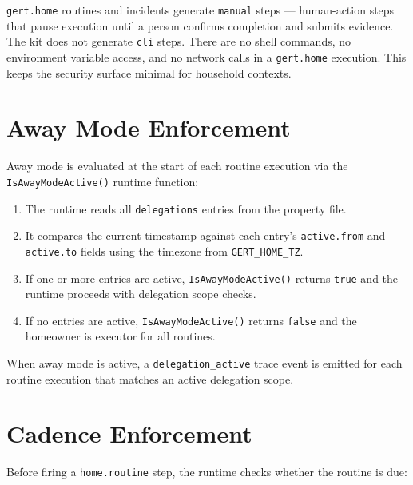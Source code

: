 \texttt{gert.home} routines and incidents generate \texttt{manual} steps --- human-action
steps that pause execution until a person confirms completion and submits evidence.
The kit does not generate \texttt{cli} steps. There are no shell commands, no environment
variable access, and no network calls in a \texttt{gert.home} execution. This keeps the
security surface minimal for household contexts.

\section{Away Mode Enforcement}
\label{sec:integration-away-mode}

Away mode is evaluated at the start of each routine execution via the
\texttt{IsAwayModeActive()} runtime function:

\begin{enumerate}
  \item The runtime reads all \texttt{delegations} entries from the property file.
  \item It compares the current timestamp against each entry's \texttt{active.from} and
        \texttt{active.to} fields using the timezone from \texttt{GERT\_HOME\_TZ}.
  \item If one or more entries are active, \texttt{IsAwayModeActive()} returns \texttt{true}
        and the runtime proceeds with delegation scope checks.
  \item If no entries are active, \texttt{IsAwayModeActive()} returns \texttt{false} and
        the homeowner is executor for all routines.
\end{enumerate}

When away mode is active, a \texttt{delegation\_active} trace event is emitted for each
routine execution that matches an active delegation scope.

\section{Cadence Enforcement}
\label{sec:integration-cadence}

Before firing a \texttt{home.routine} step, the runtime checks whether the routine is due:

